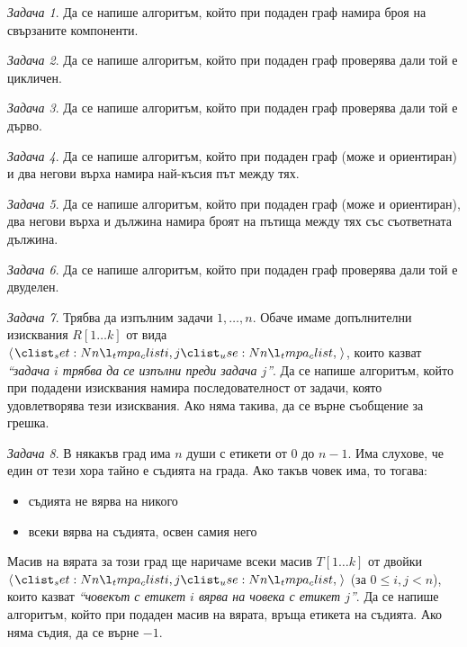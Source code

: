 \documentclass{article}
\theoremstyle{definition}
\theoremstyle{plain}
\theoremstyle{remark}
\newtheorem{problem}{Задача}
\theoremstyle{definition}
\begin{document}
\begin{problem}
Да се напише алгоритъм, който при подаден граф намира броя на свързаните компоненти.
\end{problem}

\begin{problem}
Да се напише алгоритъм, който при подаден граф проверява дали той е цикличен.
\end{problem}

\begin{problem}
Да се напише алгоритъм, който при подаден граф проверява дали той е дърво.
\end{problem}

\begin{problem}
Да се напише алгоритъм, който при подаден граф (може и ориентиран) и два негови върха намира най-късия път между тях.
\end{problem}

\begin{problem}
Да се напише алгоритъм, който при подаден граф (може и ориентиран), два негови върха и дължина намира броят на пътища между тях със съответната дължина.
\end{problem}

\begin{problem}
Да се напише алгоритъм, който при подаден граф проверява дали той е двуделен.
\end{problem}

\begin{problem}
Трябва да изпълним задачи $1, \dots, n$.
Обаче имаме допълнителни изисквания $R[1 \dots k]$ от вида $\opair{i, j}$, които казват \textit{``задача $i$ трябва да се изпълни преди задача $j$''}.
Да се напише алгоритъм, който при подадени изисквания намира последователност от задачи, която удовлетворява тези изисквания.
Ако няма такива, да се върне съобщение за грешка.
\end{problem}

\begin{problem}
В някакъв град има $n$ души с етикети от $0$ до $n - 1$.
Има слухове, че един от тези хора тайно е съдията на града.
Ако такъв човек има, то тогава:
\begin{itemize}
  \item съдията не вярва на никого
  \item всеки вярва на съдията, освен самия него
\end{itemize}
Масив на вярата за този град ще наричаме всеки масив $T[1 \dots k]$ от двойки $\opair{i, j}$ (за $0 \leq i, j < n$), които казват \textit{``човекът с етикет $i$ вярва на човека с етикет $j$''}.
Да се напише алгоритъм, който при подаден масив на вярата, връща етикета на съдията.
Ако няма съдия, да се върне $-1$.
\end{problem}
\end{document}
